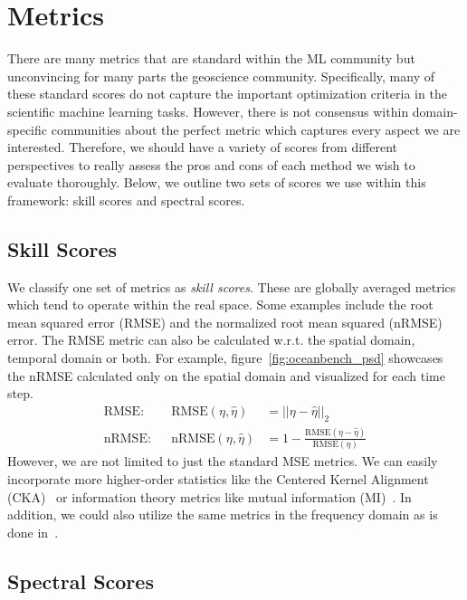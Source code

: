 \section{Metrics} \label{sec:metrics}

There are many metrics that are standard within the ML community but unconvincing for many parts the geoscience community. 
Specifically, many of these standard scores do not capture the important optimization criteria in the scientific machine learning tasks.
However, there is not consensus within domain-specific communities about the perfect metric which captures every aspect we are interested.
Therefore, we should have a variety of scores from different perspectives to really assess the pros and cons of each method we wish to evaluate thoroughly. 
Below, we outline two sets of scores we use within this framework: skill scores and spectral scores.

\subsection{Skill Scores}

We classify one set of metrics as \textit{skill scores}. 
These are globally averaged metrics which tend to operate within the real space.
Some examples include the root mean squared error (RMSE) and the normalized root mean squared (nRMSE) error.
The RMSE metric can also be calculated w.r.t. the spatial domain, temporal domain or both. 
For example, figure~\ref{fig:oceanbench_psd} showcases the nRMSE calculated only on the spatial domain and visualized for each time step.
%
\begin{align}
    \text{RMSE}: &&\text{RMSE}(\eta,\hat{\eta}) &= ||\eta - \hat{\eta}||_2 \label{eq:RMSE}\\
    \text{nRMSE}: &&\text{nRMSE}(\eta,\hat{\eta}) &= 1 - \frac{\text{RMSE}(\eta - \hat{\eta})}{\text{RMSE}(\eta)} \label{eq:nRMSE}
\end{align}
%
However, we are not limited to just the standard MSE metrics.
We can easily incorporate more higher-order statistics like the Centered Kernel Alignment (CKA)~\cite{METRICSCKA} or information theory metrics like mutual information (MI)~\cite{METRICSITRBIG,METRICSITRBIG2}.
In addition, we could also utilize the same metrics in the frequency domain as is done in~\citep{PDEBench}.

\subsection{Spectral Scores}

